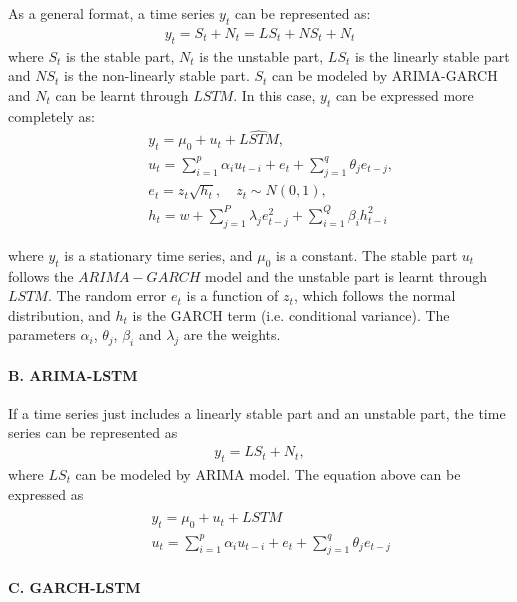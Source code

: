 As a general format, a time series $y_t$ can be represented as:
\begin{eqnarray}
     y_t = S_t + N_t = LS_t + NS_t + N_t
\end{eqnarray}
where $S_t$ is the  stable part, $N_t$ is the unstable part, $LS_t$ is the linearly stable part and $NS_t$ is the non-linearly stable part.  $S_t$ can be modeled by ARIMA-GARCH and $N_t$ can be learnt through $LSTM$. In this case, $y_t$ can be expressed more completely as:
\begin{eqnarray}
&& y_t = \mu_0  + u_t + \widehat{LSTM}, \nonumber \\
&& u_t = \sum_{i=1}^{p} {\alpha_i{u_{t-i}}} + e_t+ \sum_{j=1}^{q} {\theta_j{e_{t-j}}},\nonumber\\
&& e_t = z_t{\sqrt{h_t}}, \quad  z_t\sim N(0,1), \nonumber \\
&& h_t = w+\sum_{j=1}^{P}{\lambda_j{e_{t-j}^2}}+\sum_{i=1}^{Q}{\beta_i{h_{t-i}^2}}
\end{eqnarray}

where $y_t$ is a stationary time series, and $\mu_0$ is a constant. The stable part $u_t$ follows the $ARIMA-GARCH$ model and the unstable part  is learnt through $LSTM$. The random error $e_t$ is a function of $z_t$, which follows the normal distribution,  and $h_t$ is the GARCH term  (i.e. conditional variance). The parameters $\alpha_i$, $\theta_j$, $\beta_i$ and $\lambda_j$ are the weights. 

                    
\paragraph{B. ARIMA-LSTM}

If a time series just includes a linearly stable part and an unstable part, the time series can be represented as
\begin{eqnarray}
     y_t = LS_t +  N_t,
\end{eqnarray}
where $LS_t$ can be modeled by ARIMA model. The equation above can be expressed as
\begin{eqnarray}
&& y_t = \mu_0 + u_t + \widehat{LSTM} \nonumber\\
&& u_t = \sum_{i=1}^{p} {\alpha_i{u_{t-i}}} + e_t+ \sum_{j=1}^{q} {\theta_j{e_{t-j}}}
\end{eqnarray}
\paragraph{C. GARCH-LSTM}

